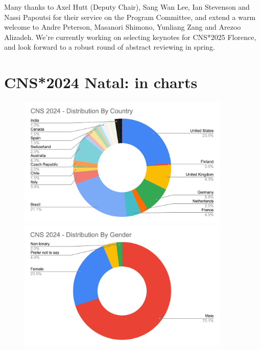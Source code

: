 \documentclass[11pt,a4paper,oneside]{article}
\begin{document}
Many thanks to Axel Hutt (Deputy Chair), Sang Wan Lee, Ian Stevenson and Nassi Papoutsi for their service on the Program Committee, and extend a warm welcome to Andre Peterson, Masanori Shimono, Yunliang Zang and Arezoo Alizadeh.
We're currently working on selecting keynotes for CNS*2025 Florence, and look forward to a robust round of abstract reviewing in spring.

\clearpage
\section*{CNS*2024 Natal: in charts}%
\vspace{-4ex}
\sectionauthor{}
\begin{figure}[ht]
  \centering
  \includegraphics[width=0.9\textwidth]{images/cns2024-attendees-distribution-1}\\\vspace{3ex}
  \includegraphics[width=0.9\textwidth]{images/cns2024-attendees-distribution-gender-1}
\end{figure}
\end{document}
